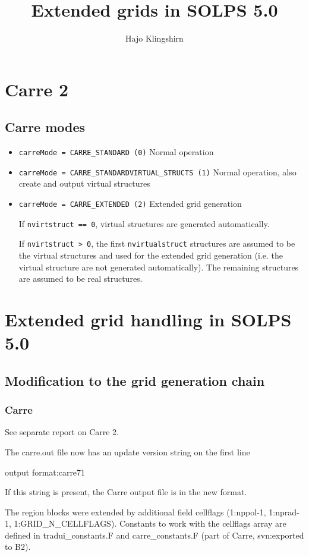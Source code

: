 \documentclass[10pt,a4paper]{report}
\author{Hajo Klingshirn}
\title{Extended grids in SOLPS 5.0}
\begin{document}
\chapter{Carre 2}

\section{Carre modes}

\begin{itemize}
\item
\verb+carreMode = CARRE_STANDARD (0)+ Normal operation
\item
\verb+carreMode = CARRE_STANDARDVIRTUAL_STRUCTS (1)+ Normal operation, also create and output virtual structures
\item
\verb+carreMode = CARRE_EXTENDED (2)+ Extended grid generation

If \verb+nvirtstruct == 0+, virtual structures are generated automatically.

If \verb+nvirtstruct > 0+, the first \verb+nvirtualstruct+ structures are assumed to be the virtual structures and used
for the extended grid generation (i.e. the virtual structure are not generated automatically). 
The remaining structures are assumed to be real structures. 
\end{itemize}





\chapter{Extended grid handling in SOLPS 5.0}

\section{Modification to the grid generation chain}

\subsection{Carre}
See separate report on Carre 2.

The carre.out file now has an update version string on the first line 

 output format:carre71 

If this string is present, the Carre output file is in the new format.

The region blocks were extended by additional field cellflags (1:nppol-1, 1:nprad-1, 1:GRID\_N\_CELLFLAGS).
Constants to work with the cellflags array are defined in tradui\_constants.F and carre\_constants.F (part of Carre, svn:exported to B2).
\end{document}
